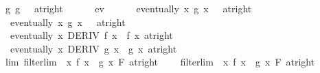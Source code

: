 \begin{isabellebody}
\ \ \ \ \ g{\isacharunderscore}{\kern0pt}{}{\isacharcolon}{\kern0pt}\ {\isachardoublequoteopen}{\isacharparenleft}{\kern0pt}g{}\ {\isasymlonglongrightarrow}\ {}{\isacharparenright}{\kern0pt}\ {\isacharparenleft}{\kern0pt}at{\isacharunderscore}{\kern0pt}right\ {}{\isacharparenright}{\kern0pt}{\isachardoublequoteclose}\isanewline
\ \ \ \ \ ev{\isacharcolon}{\kern0pt}\isanewline
\ \ \ \ \ \ {\isachardoublequoteopen}eventually\ {\isacharparenleft}{\kern0pt}{\isasymlambda}x{\isachardot}{\kern0pt}\ g{}\ x\ {\isasymnoteq}\ {}{\isacharparenright}{\kern0pt}\ {\isacharparenleft}{\kern0pt}at{\isacharunderscore}{\kern0pt}right\ {}{\isacharparenright}{\kern0pt}{\isachardoublequoteclose}\isanewline
\ \ \ \ \ \ {\isachardoublequoteopen}eventually\ {\isacharparenleft}{\kern0pt}{\isasymlambda}x{\isachardot}{\kern0pt}\ g{\isacharprime}{\kern0pt}\ x\ {\isasymnoteq}\ {}{\isacharparenright}{\kern0pt}\ {\isacharparenleft}{\kern0pt}at{\isacharunderscore}{\kern0pt}right\ {}{\isacharparenright}{\kern0pt}{\isachardoublequoteclose}\isanewline
\ \ \ \ \ \ {\isachardoublequoteopen}eventually\ {\isacharparenleft}{\kern0pt}{\isasymlambda}x{\isachardot}{\kern0pt}\ DERIV\ f{}\ x\ {\isacharcolon}{\kern0pt}{\isachargreater}{\kern0pt}\ f{\isacharprime}{\kern0pt}\ x{\isacharparenright}{\kern0pt}\ {\isacharparenleft}{\kern0pt}at{\isacharunderscore}{\kern0pt}right\ {}{\isacharparenright}{\kern0pt}{\isachardoublequoteclose}\isanewline
\ \ \ \ \ \ {\isachardoublequoteopen}eventually\ {\isacharparenleft}{\kern0pt}{\isasymlambda}x{\isachardot}{\kern0pt}\ DERIV\ g{}\ x\ {\isacharcolon}{\kern0pt}{\isachargreater}{\kern0pt}\ g{\isacharprime}{\kern0pt}\ x{\isacharparenright}{\kern0pt}\ {\isacharparenleft}{\kern0pt}at{\isacharunderscore}{\kern0pt}right\ {}{\isacharparenright}{\kern0pt}{\isachardoublequoteclose}\isanewline
\ \ \ \ \ lim{\isacharcolon}{\kern0pt}\ {\isachardoublequoteopen}filterlim\ {\isacharparenleft}{\kern0pt}{\isasymlambda}\ x{\isachardot}{\kern0pt}\ {\isacharparenleft}{\kern0pt}f{\isacharprime}{\kern0pt}\ x\ {\isacharslash}{\kern0pt}\ g{\isacharprime}{\kern0pt}\ x{\isacharparenright}{\kern0pt}{\isacharparenright}{\kern0pt}\ F\ {\isacharparenleft}{\kern0pt}at{\isacharunderscore}{\kern0pt}right\ {}{\isacharparenright}{\kern0pt}{\isachardoublequoteclose}\isanewline
\ \ \ {\isachardoublequoteopen}filterlim\ {\isacharparenleft}{\kern0pt}{\isasymlambda}\ x{\isachardot}{\kern0pt}\ f{}\ x\ {\isacharslash}{\kern0pt}\ g{}\ x{\isacharparenright}{\kern0pt}\ F\ {\isacharparenleft}{\kern0pt}at{\isacharunderscore}{\kern0pt}right\ {}{\isacharparenright}{\kern0pt}{\isachardoublequoteclose}\isanewline

\end{isabellebody}
